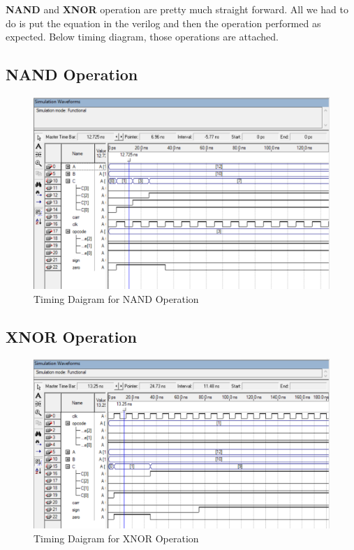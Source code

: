 \textbf{NAND} and \textbf{XNOR} operation are pretty much straight forward.
All we had to do is put the equation in the verilog and then the
operation performed as expected.
Below timing diagram, those operations are attached.

\subsection{NAND Operation}\label{subsec:nand-operation}

\begin{figure}[H]
    \begin{center}
        \includegraphics[scale=0.2]{figures/nand}
    \end{center}
    \caption{Timing Daigram for NAND Operation}
    \label{fig:timing nand}
\end{figure}

\subsection{XNOR Operation}\label{subsec:xnor-operation}
\begin{figure}[H]
    \begin{center}
        \includegraphics[scale=0.2]{figures/xnor}
    \end{center}
    \caption{Timing Daigram for XNOR Operation}
    \label{fig:timing xnor}
\end{figure}

